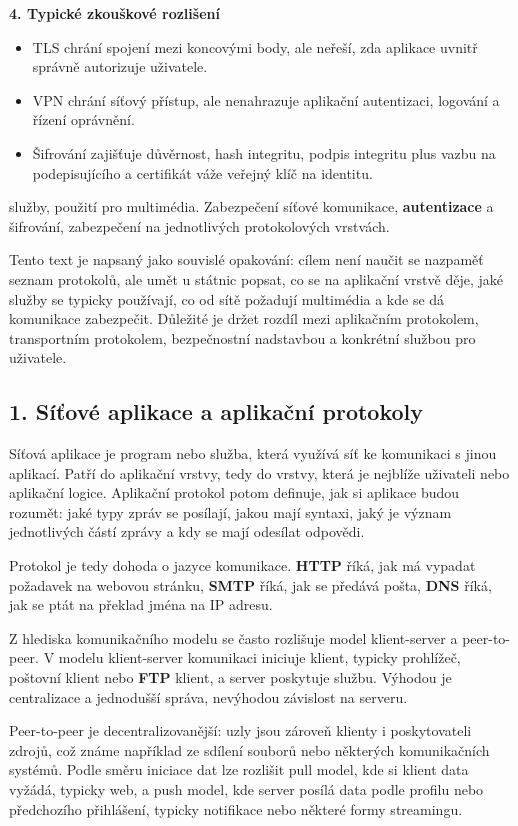 \textbf{4. Typické zkouškové rozlišení}
\begin{itemize}
  \item TLS chrání spojení mezi koncovými body, ale neřeší, zda aplikace uvnitř správně autorizuje uživatele.
  \item VPN chrání síťový přístup, ale nenahrazuje aplikační autentizaci, logování a řízení oprávnění.
  \item Šifrování zajišťuje důvěrnost, hash integritu, podpis integritu plus vazbu na podepisujícího a certifikát váže veřejný klíč na identitu.
\end{itemize}

služby, použití pro multimédia. Zabezpečení síťové komunikace, \textbf{autentizace} a šifrování, zabezpečení na jednotlivých protokolových vrstvách.

Tento text je napsaný jako souvislé opakování: cílem není naučit se nazpaměť seznam protokolů, ale umět u státnic popsat, co se na aplikační vrstvě děje, jaké služby se typicky používají, co od sítě požadují multimédia a kde se dá komunikace zabezpečit. Důležité je držet rozdíl mezi aplikačním protokolem, transportním protokolem, bezpečnostní nadstavbou a konkrétní službou pro uživatele.

\subsection*{1. Síťové aplikace a aplikační protokoly}

Síťová aplikace je program nebo služba, která využívá síť ke komunikaci s jinou aplikací. Patří do aplikační vrstvy, tedy do vrstvy, která je nejblíže uživateli nebo aplikační logice. Aplikační protokol potom definuje, jak si aplikace budou rozumět: jaké typy zpráv se posílají, jakou mají syntaxi, jaký je význam jednotlivých částí zprávy a kdy se mají odesílat odpovědi.

Protokol je tedy dohoda o jazyce komunikace. \textbf{HTTP} říká, jak má vypadat požadavek na webovou stránku, \textbf{SMTP} říká, jak se předává pošta, \textbf{DNS} říká, jak se ptát na překlad jména na IP adresu.

Z hlediska komunikačního modelu se často rozlišuje model klient-server a peer-to-peer. V modelu klient-server komunikaci iniciuje klient, typicky prohlížeč, poštovní klient nebo \textbf{FTP} klient, a server poskytuje službu. Výhodou je centralizace a jednodušší správa, nevýhodou závislost na serveru.

Peer-to-peer je decentralizovanější: uzly jsou zároveň klienty i poskytovateli zdrojů, což známe například ze sdílení souborů nebo některých komunikačních systémů. Podle směru iniciace dat lze rozlišit pull model, kde si klient data vyžádá, typicky web, a push model, kde server posílá data podle profilu nebo předchozího přihlášení, typicky notifikace nebo některé formy streamingu.

